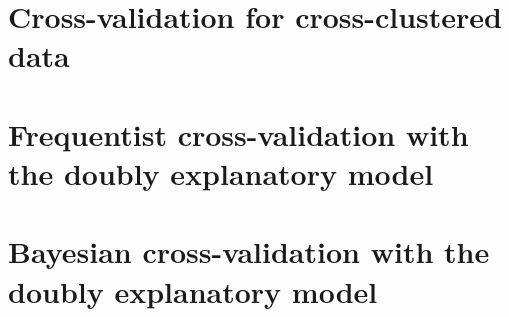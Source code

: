 \documentclass{ucbthesis}
\begin{document}
\pagestyle{headings}


\newpage
\chapter{Cross-validation for cross-clustered data}


\newpage
\chapter{Frequentist cross-validation with the doubly explanatory model}


\newpage
\chapter{Bayesian cross-validation with the doubly explanatory model}




\printbibliography
\end{document}
